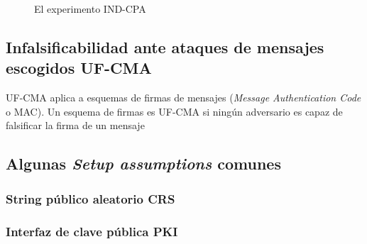 \begin{figure}
\begin{centering}
\end{centering}
\caption{El experimento IND-CPA}
\label{fig:ind_cpa}
\end{figure}


\subsection{Infalsificabilidad ante ataques de mensajes escogidos UF-CMA}
UF-CMA aplica a esquemas de firmas de mensajes (\textit{Message Authentication Code} o MAC). Un esquema de firmas
es UF-CMA si ningún adversario es capaz de falsificar la firma de un mensaje 

\subsection{Algunas \textit{Setup assumptions} comunes}
\subsubsection{String público aleatorio CRS}
\subsubsection{Interfaz de clave pública PKI}


